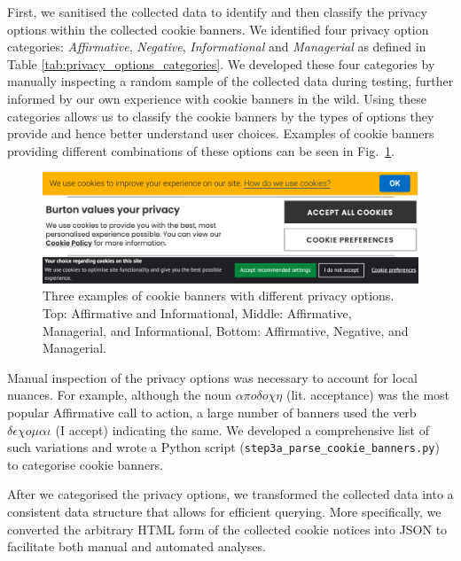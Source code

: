 First, we sanitised the collected data to identify and then classify the privacy options within the collected cookie banners. We identified four privacy option categories: \emph{Affirmative}, \emph{Negative}, \emph{Informational} and \emph{Managerial} as defined in Table \ref{tab:privacy_options_categories}. We developed these four categories by manually inspecting a random sample of the collected data during testing, further informed by our own experience with cookie banners in the wild. Using these categories allows us to classify the cookie banners by the types of options they provide and hence better understand user choices. Examples of cookie banners providing different combinations of these options can be seen in Fig.~\ref{fig:cookie_banners}. 


\begin{figure}[t]
    \centering
    \includegraphics[width=\textwidth]{images/methodology/cookie_banners.png}
    \caption{Three examples of cookie banners with different privacy options. 
             Top: Affirmative and Informational, 
             Middle: Affirmative, Managerial, and Informational, 
             Bottom: Affirmative, Negative, and Managerial.}
    \label{fig:cookie_banners}
\end{figure}

Manual inspection of the privacy options was necessary to account for local nuances. For example, although the noun $\alpha\pi o\delta o\chi\eta$ (lit. acceptance) was the most popular Affirmative call to action, a large number of banners used the verb $\delta\epsilon\chi o\mu\alpha\iota$ (I accept) indicating the same. We developed a comprehensive list of such variations and wrote a Python script (\texttt{step3a\_parse\_cookie\_banners.py}) to categorise cookie banners.

After we categorised the privacy options, we transformed the collected data into a consistent data structure that allows for efficient querying. More specifically, we converted the arbitrary HTML form of the collected cookie notices into JSON to facilitate both manual and automated analyses. 

